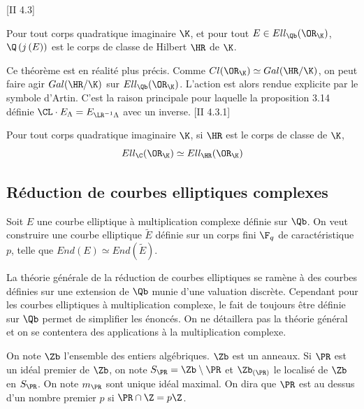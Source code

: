 \begin{The}\cite{Sil94}[II 4.3]
	
	Pour tout corps quadratique imaginaire $\K$, et pour tout $E\in Ell_{\Qb}(\OR_{\K})$, $\Q\left( j\left( E\right) \right)$ est le corps de classe de Hilbert $\HR$ de $\K$.
	
\end{The}

\begin{Rem}
	Ce théorème est en réalité plus précis. Comme $Cl(\OR_{\K})\simeq Gal(\HR/\K)$, on peut faire agir $Gal(\HR/\K)$ sur $Ell_{\Qb}(\OR_{\K})$. L'action est alors rendue explicite par le symbole d'Artin. C'est la raison principale pour laquelle la proposition 3.14 définie $\CL\cdot E_{\Lambda} = E_{\LR^{-1}\Lambda}$ avec un inverse. \cite{Sil94}[II 4.3.1]
\end{Rem}


\begin{Coro}
	Pour tout corps quadratique imaginaire $\K$, si $\HR$ est le corps de classe de $\K$, 
	\begin{equation*}
		Ell_{\C}(\OR_{\K})\simeq Ell_{\HR}(\OR_{\K})
	\end{equation*}
	
\end{Coro}






\subsection{Réduction de courbes elliptiques complexes}


Soit $E$ une courbe elliptique à multiplication complexe définie sur $\Qb$. On veut construire une courbe elliptique $\tilde{E}$ définie sur un corps fini $\F_{q}$ de caractéristique $p$, telle que $End(E)\simeq End(\tilde{E})$.

\begin{Rem}
	La théorie générale de la réduction de courbes elliptiques se ramène à des courbes définies sur une extension de $\Qb$ munie d'une valuation discrète. Cependant pour les courbes elliptiques à multiplication complexe, le fait de toujours être définie sur $\Qb$ permet de simplifier les énoncés. On ne détaillera pas la théorie général et on se contentera des applications à la multiplication complexe.
\end{Rem}  

\begin{Def}
	On note $\Zb$ l'ensemble des entiers algébriques. $\Zb$ est un anneaux. Si $\PR$ est un idéal premier de $\Zb$, on note $S_{\PR} = \Zb\setminus\PR$ et $\Zb_{\left( \PR\right) }$ le localisé de $\Zb$ en $S_{\PR}$. On note $m_{\PR}$ sont unique idéal maximal. On dira que $\PR$ est au dessus d'un nombre premier $p$ si $\PR\cap\Z = p\Z$. 
\end{Def}

